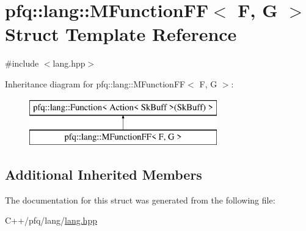 \hypertarget{structpfq_1_1lang_1_1MFunctionFF}{\section{pfq\+:\+:lang\+:\+:M\+Function\+F\+F$<$ F, G $>$ Struct Template Reference}
\label{structpfq_1_1lang_1_1MFunctionFF}
}


{\ttfamily \#include $<$lang.\+hpp$>$}

Inheritance diagram for pfq\+:\+:lang\+:\+:M\+Function\+F\+F$<$ F, G $>$\+:\begin{figure}[H]
\begin{center}
\leavevmode
\includegraphics[height=2.000000cm]{structpfq_1_1lang_1_1MFunctionFF}
\end{center}
\end{figure}
\subsection*{Additional Inherited Members}


The documentation for this struct was generated from the following file\+:\begin{DoxyCompactItemize}
\item 
C++/pfq/lang/\hyperlink{lang_8hpp}{lang.\+hpp}\end{DoxyCompactItemize}
